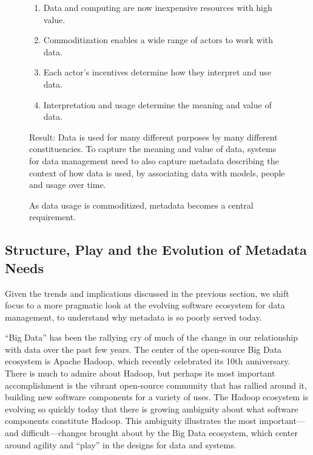 \documentclass[10pt,letterpaper]{article}
\begin{document}
\begin{figure*}[t]
\begin{centering}
\begin{tcolorbox}[width=0.75\linewidth]
\begin{enumerate}
\item Data and computing are now inexpensive resources with high value.
\item Commoditization enables a wide range of actors to work with data.
\item Each actor's incentives determine how they interpret and use data.
\item Interpretation and usage determine the meaning and value of data.
\end{enumerate}
Result: Data is used for many different purposes by many different constituencies.  To capture the meaning and value of data, systems for data management need to also capture metadata describing the context of how data is used, by associating data with models, people and usage over time. 
\end{tcolorbox}
\end{centering}
\caption{As data usage is commoditized, metadata becomes a central requirement.}
\label{fig:syllogism}
\end{figure*}



\subsection{Structure, Play and the Evolution of Metadata Needs}
Given the trends and implications discussed in the previous section, we shift focus to a more pragmatic look at the evolving software ecosystem for data management, to understand why metadata is so poorly served today.

``Big Data'' has been the rallying cry of much of the change in our relationship with data over the past few years.  
The center of the open-source Big Data ecosystem is Apache Hadoop, which recently celebrated its 10th anniversary.  There is much to admire about Hadoop, but perhaps its most important accomplishment is the vibrant open-source community that has rallied around it, building new software components for a variety of uses. The Hadoop ecosystem is evolving so quickly today that there is growing ambiguity about what software components constitute Hadoop.  This ambiguity illustrates the most important---and difficult---changes brought about by the Big Data ecosystem, which center around agility and ``play'' in the designs for data and systems.  
\end{document}

